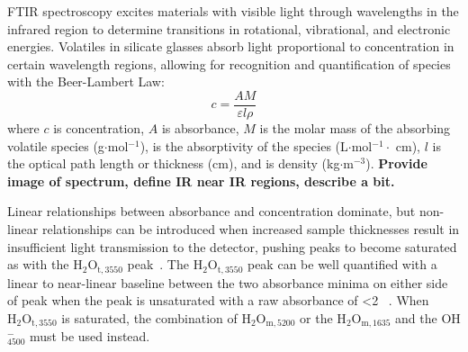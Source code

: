 \documentclass[draft]{agujournal2019}
\begin{document}
FTIR spectroscopy excites materials with visible light through wavelengths in the infrared region to determine transitions in rotational, vibrational, and electronic energies. Volatiles in silicate glasses absorb light proportional to concentration in certain wavelength regions, allowing for recognition and quantification of species with the Beer-Lambert Law: 
\begin{equation}
c = \frac{A M}{\varepsilon l \rho}
\end{equation}
where $c$ is concentration, $A$ is absorbance, $M$ is the molar mass of the absorbing volatile species (g$\cdot$mol$^{-1}$), \textepsilon{} is the absorptivity of the species (L$\cdot$mol$^{-1}\cdot$ cm), $l$ is the optical path length or thickness (cm), and \textrho{} is density (kg$\cdot$m$^{-3}$). \textbf{Provide image of spectrum, define IR near IR regions, describe a bit.} 

Linear relationships between absorbance and concentration dominate, but non-linear relationships can be introduced when increased sample thicknesses result in insufficient light transmission to the detector, pushing peaks to become saturated as with the ${\mathrm{H_2O_{t, 3550}}}$ peak~\cite{McIntoshetal2017, vonAulocketal2014}. The ${\mathrm{H_2O_{t, 3550}}}$ peak can be well quantified with a linear to near-linear baseline between the two absorbance minima on either side of peak when the peak is unsaturated with a raw absorbance of \textless 2 ~\cite{DixonandStolper1995, vonAulocketal2014}. When \textepsilon${\mathrm{H_2O_{t, 3550}}}$ is saturated, the combination of H$_{2}$O$_{\mathrm{m}, 5200}$ or the H$_{2}$O$_{\mathrm{m}, 1635}$ and the OH$^{-}_{4500}$ must be used instead. 
\end{document}
